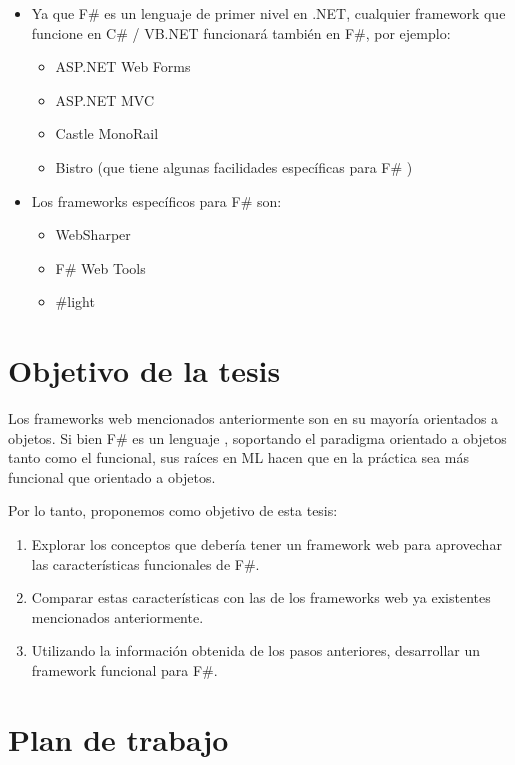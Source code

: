 \documentclass[12pt]{article}
\begin{document}
\begin{itemize}
	\item Ya que F\# es un lenguaje de primer nivel en .NET, cualquier framework que funcione en C\# / VB.NET funcionará también en F\#, por ejemplo:
	\begin{itemize}
		\item ASP.NET Web Forms \cite{webforms}
		\item ASP.NET MVC \cite{mvc}
		\item Castle MonoRail \cite{monorail}
		\item Bistro \cite{bistro} (que tiene algunas facilidades específicas para F\# \cite{bistroext})
	\end{itemize}
	\item Los frameworks específicos para F\# son:
	\begin{itemize}
		\item WebSharper \cite{websharper}
		\item F\# Web Tools \cite{fswebtools}
		\item \#light \cite{sharplight}
	\end{itemize}
\end{itemize}

\section{Objetivo de la tesis}

Los frameworks web mencionados anteriormente son en su mayoría orientados a objetos. Si bien F\# es un lenguaje , soportando el paradigma orientado a objetos tanto como el funcional, sus raíces en ML hacen que en la práctica sea más funcional que orientado a objetos.

Por lo tanto, proponemos como objetivo de esta tesis:
\begin{enumerate}
	\item Explorar los conceptos que debería tener un framework web para aprovechar las características funcionales de F\#.
	\item Comparar estas características con las de los frameworks web ya existentes mencionados anteriormente.
	\item Utilizando la información obtenida de los pasos anteriores, desarrollar un framework funcional para F\#. 
\end{enumerate}

\section{Plan de trabajo}
\end{document}
